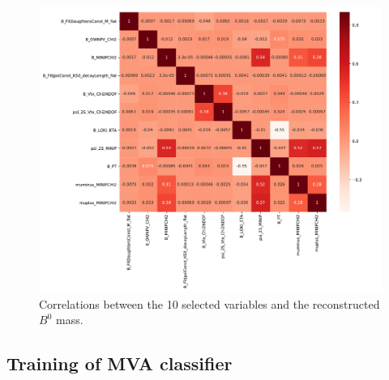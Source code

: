 \begin{figure}
  \centering
  \includegraphics[width = .9\textwidth]{"content/plots/correlations.pdf"}
  \caption{Correlations between the 10 selected variables and the reconstructed $B^0$ mass.}
  \label{fig:correlations}
\end{figure}

\subsection{Training of MVA classifier}


